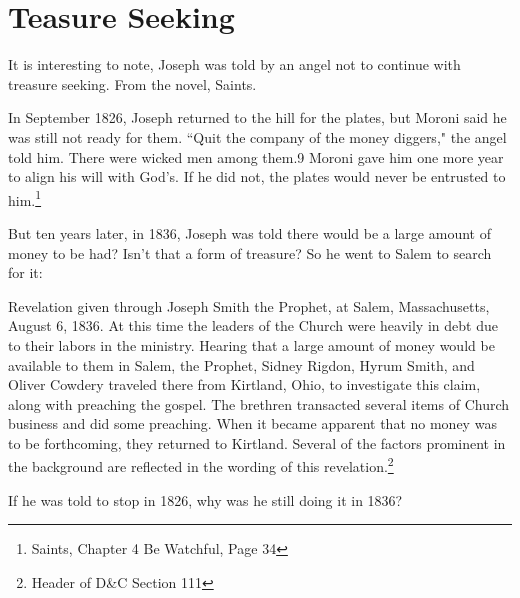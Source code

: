 \chapter{Teasure Seeking}

It is interesting to note, Joseph was told by an angel not to continue with treasure
seeking. From the novel, Saints.

\begin{displayquote}
In September 1826, Joseph returned to the hill for the plates, but Moroni said he was 
still not ready for them. ``Quit the company of the money diggers," the angel told 
him. There were wicked men among them.9 Moroni gave him one more year to align his 
will with God’s. If he did not, the plates would never be entrusted to 
him.\footnote{Saints, Chapter 4 Be Watchful, Page 34}
\end{displayquote}

But ten years later, in 1836, Joseph was told there would be a large amount of money
to be had? Isn't that a form of treasure? So he went to Salem to search for it:

\begin{displayquote}
Revelation given through Joseph Smith the Prophet, at Salem, Massachusetts, 
August 6, 1836. At this time the leaders of the Church were heavily in debt due to 
their labors in the ministry. Hearing that a large amount of money would be available 
to them in Salem, the Prophet, Sidney Rigdon, Hyrum Smith, and Oliver Cowdery 
traveled there from Kirtland, Ohio, to investigate this claim, along with preaching 
the gospel. The brethren transacted several items of Church business and did some 
preaching. When it became apparent that no money was to be forthcoming, they returned 
to Kirtland. Several of the factors prominent in the background are reflected in 
the wording of this revelation.\footnote{Header of D\&C Section 111}
\end{displayquote}

If he was told to stop in 1826, why was he still doing it in 1836?
